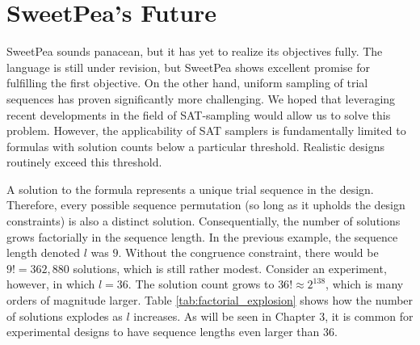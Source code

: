 \section{SweetPea's Future}

SweetPea sounds panacean, but it has yet to realize its objectives fully. The language is still under revision, but SweetPea shows excellent promise for fulfilling the first objective. On the other hand, uniform sampling of trial sequences has proven significantly more challenging. We hoped that leveraging recent developments in the field of SAT-sampling would allow us to solve this problem. However, the applicability of SAT samplers is fundamentally limited to formulas with solution counts below a particular threshold. Realistic designs routinely exceed this threshold.

A solution to the formula represents a unique trial sequence in the design. Therefore, every possible sequence permutation (so long as it upholds the design constraints) is also a distinct solution. Consequentially, the number of solutions grows factorially in the sequence length. In the previous example, the sequence length denoted $l$ was $9$. Without the congruence constraint, there would be $9! = 362,880$ solutions, which is still rather modest. Consider an experiment, however, in which $l = 36$. The solution count grows to $36! \approx 2^{138}$, which is many orders of magnitude larger. Table \ref{tab:factorial_explosion} shows how the number of solutions explodes as $l$ increases. As will be seen in Chapter 3, it is common for experimental designs to have sequence lengths even larger than 36.

